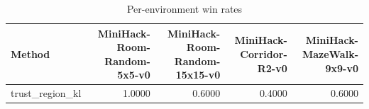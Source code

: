 \begin{table}[htbp]
\centering
\caption{Per-environment win rates}
\label{tab:per-env}
\begin{tabular}{lrrrr}
\toprule
\textbf{Method} & \textbf{MiniHack-Room-Random-5x5-v0} & \textbf{MiniHack-Room-Random-15x15-v0} & \textbf{MiniHack-Corridor-R2-v0} & \textbf{MiniHack-MazeWalk-9x9-v0} \\
\midrule
trust\_region\_kl & 1.0000 & 0.6000 & 0.4000 & 0.6000 \\
\bottomrule
\end{tabular}
\end{table}